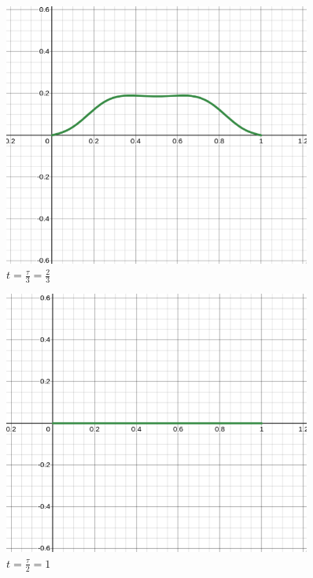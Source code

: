 \documentclass[letter, 10pts]{article}
\begin{document}
\hfill %
\begin{minipage}{0.5\textwidth}
\begin{figure}[H]
	\centering
	\includegraphics[width=0.9\textwidth]{../phys311/ss/d_n_02.png}
	\caption{$t = \frac{\tau}{3} = \frac{2}{3}$}
	\label{fig:ss-c_n_01-png}
\end{figure}
\begin{figure}[H]
	\centering
	\includegraphics[width=0.9\textwidth]{../phys311/ss/d_n_03.png}
	\caption{$t = \frac{\tau}{2} = 1$}
	\label{fig:ss-c_n_01-png}
\end{figure}
\end{minipage}
\newpage
\end{document}
